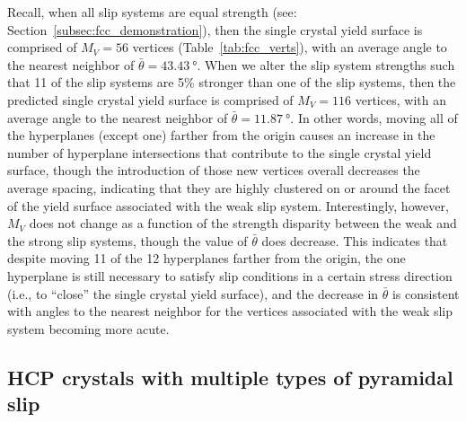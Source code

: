 \documentclass[preprint,3p,times,sort&compress,letterpaper,12pt]{elsarticle} %
\begin{document}
Recall, when all slip systems are equal strength (see: Section~\ref{subsec:fcc_demonstration}), then the single crystal yield surface is comprised of $M_V=56$ vertices (Table~\ref{tab:fcc_verts}), with an average angle to the nearest neighbor of $\bar{\theta}=\SI{43.43}{\degree}$. When we alter the slip system strengths such that 11 of the slip systems are 5\% stronger than one of the slip systems, then the predicted single crystal yield surface is comprised of $M_V=116$ vertices, with an average angle to the nearest neighbor of $\bar{\theta}=\SI{11.87}{\degree}$. In other words, moving all of the hyperplanes (except one) farther from the origin causes an increase in the number of hyperplane intersections that contribute to the single crystal yield surface, though the introduction of those new vertices overall decreases the average spacing, indicating that they are highly clustered on or around the facet of the yield surface associated with the weak slip system. Interestingly, however, $M_V$ does not change as a function of the strength disparity between the weak and the strong slip systems, though the value of $\bar{\theta}$ does decrease. This indicates that despite moving 11 of the 12 hyperplanes farther from the origin, the one hyperplane is still necessary to satisfy slip conditions in a certain stress direction (i.e., to ``close'' the single crystal yield surface), and the decrease in $\bar{\theta}$ is consistent with angles to the nearest neighbor for the vertices associated with the weak slip system becoming more acute.

\subsection{HCP crystals with multiple types of pyramidal slip}
\label{subsubsec:hcp_with_a}
\end{document}
